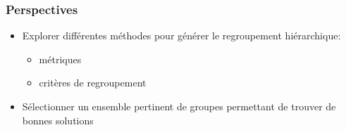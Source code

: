\documentclass[table]{beamer}
\begin{document}
\begin{frame}
  \frametitle{Perspectives}

  \begin{itemize}
  \item Explorer différentes méthodes pour générer le regroupement
    hiérarchique:
    \begin{itemize}
    \item métriques
    \item critères de regroupement
    \end{itemize}
  \item Sélectionner un ensemble pertinent de groupes permettant de
    trouver de bonnes solutions
  \end{itemize}
\end{frame}

\begin{frame}
  \titlepage
\end{frame}
\end{document}
